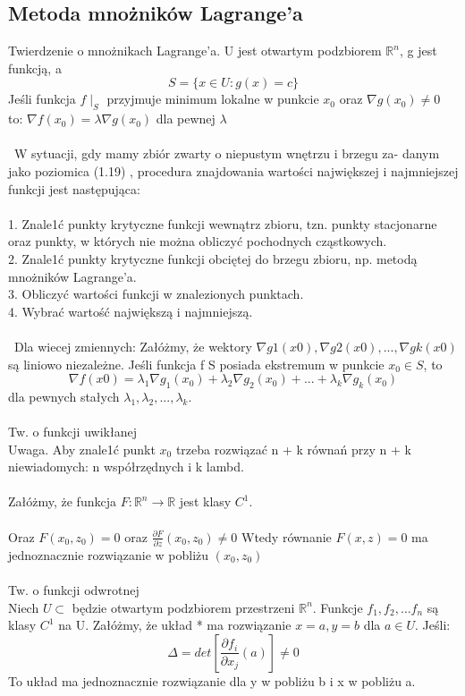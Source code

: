 \documentclass{article}
\title{}
\date{27.10.2020}
\begin{document}
\subsection*{Metoda mnożników Lagrange'a}
Twierdzenie o mnożnikach Lagrange'a. U jest otwartym podzbiorem $\mathbb{R}^n$,
g jest funkcją, a
$$
S = \{x \in U : g(x) = c\}
$$
Jeśli funkcja $f \mid_S$ przyjmuje minimum lokalne w punkcie $x_0$ oraz $\nabla g(x_0) \neq 0$ to:
$\nabla f(x_0) = \lambda \nabla g(x_0)$ dla pewnej $\lambda$\\\\\
W sytuacji, gdy mamy zbiór zwarty o niepustym wnętrzu i brzegu za-
danym jako poziomica (1.19) , procedura znajdowania wartości największej
i najmniejszej funkcji jest następująca:\\\\
1. Znale1ć punkty krytyczne funkcji wewnątrz zbioru, tzn. punkty stacjonarne
oraz punkty, w których nie można obliczyć pochodnych cząstkowych.\\
2. Znale1ć punkty krytyczne funkcji obciętej do brzegu zbioru, np. metodą
mnożników Lagrange'a.\\
3. Obliczyć wartości funkcji w znalezionych punktach.\\
4. Wybrać wartość największą i najmniejszą.\\\\\
Dla wiecej zmiennych:
Załóżmy, że wektory $\nabla g 1 (x 0 ), \nabla g 2 (x 0 ), . . . , \nabla g k (x 0 )$ są liniowo
niezależne. Jeśli funkcja f S posiada ekstremum w punkcie $x_0  \in  S$, to
$$\nabla f (x 0 ) =  \lambda_1 \nabla g_1 (x_0 ) +  \lambda_2 \nabla g_2 (x_0 ) + . . . +  \lambda_k \nabla g_k (x_0 )$$
dla pewnych stałych
$\lambda_1 ,  \lambda_2 , . . . ,  \lambda_k .$
\\\\Tw. o funkcji uwikłanej\\
Uwaga. Aby znale1ć punkt $x_0$ trzeba rozwiązać n + k równań przy n + k niewiadomych: n współrzędnych i k lambd.\\\\
Załóżmy, że funkcja $F: \mathbb{R}^n \rightarrow \mathbb{R}$ jest klasy $C^1$.\\\\ Oraz $F(x_0,z_0) = 0$ oraz $\frac{\partial F}{\partial z} (x_0,z_0) \neq 0$ Wtedy równanie $F(x,z) = 0$ ma jednoznacznie rozwiązanie w pobliżu $(x_0,z_0)$
\\\\Tw. o funkcji odwrotnej\\
Niech $U \subset $ będzie otwartym podzbiorem przestrzeni $\mathbb{R}^n$. Funkcje $f_1,f_2,\dots f_n$ są klasy $C^1$ na U. Załóżmy, że układ * ma rozwiązanie $x = a, y = b$ dla $a \in U$. Jeśli:
$$
\Delta = det \left[\frac{\partial f_i}{\partial x_j}(a) \right] \neq 0
$$
To układ ma jednoznacznie rozwiązanie dla y w pobliżu b i x w pobliżu a.
\end{document}
